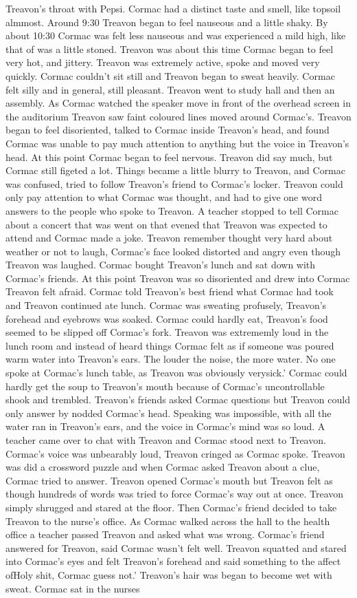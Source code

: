 \documentclass[12pt]{book}
\begin{document}
Treavon's throat with Pepsi. Cormac had a distinct taste and smell, like topsoil almmost. Around 9:30 Treavon began to feel nauseous and a little shaky. By about 10:30 Cormac was felt less nauseous and was experienced a mild high, like that of was a little stoned. Treavon was about this time Cormac began to feel very hot, and jittery. Treavon was extremely active, spoke and moved very quickly. Cormac couldn't sit still and Treavon began to sweat heavily. Cormac felt silly and in general, still pleasant. Treavon went to study hall and then an assembly. As Cormac watched the speaker move in front of the overhead screen in the auditorium Treavon saw faint coloured lines moved around Cormac's. Treavon began to feel disoriented, talked to Cormac inside Treavon's head, and found Cormac was unable to pay much attention to anything but the voice in Treavon's head. At this point Cormac began to feel nervous. Treavon did say much, but Cormac still figeted a lot. Things became a little blurry to Treavon, and Cormac was confused, tried to follow Treavon's friend to Cormac's locker. Treavon could only pay attention to what Cormac was thought, and had to give one word answers to the people who spoke to Treavon. A teacher stopped to tell Cormac about a concert that was went on that evened that Treavon was expected to attend and Cormac made a joke. Treavon remember thought very hard about weather or not to laugh, Cormac's face looked distorted and angry even though Treavon was laughed. Cormac bought Treavon's lunch and sat down with Cormac's friends. At this point Treavon was so disoriented and drew into Cormac Treavon felt afraid. Cormac told Treavon's best friend what Cormac had took and Treavon continued ate lunch. Cormac was sweating profusely, Treavon's forehead and eyebrows was soaked. Cormac could hardly eat, Treavon's food seemed to be slipped off Cormac's fork. Treavon was extrememly loud in the lunch room and instead of heard things Cormac felt as if someone was poured warm water into Treavon's ears. The louder the noise, the more water. No one spoke at Cormac's lunch table, as Treavon was obviously verysick.' Cormac could hardly get the soup to Treavon's mouth because of Cormac's uncontrollable shook and trembled. Treavon's friends asked Cormac questions but Treavon could only answer by nodded Cormac's head. Speaking was impossible, with all the water ran in Treavon's ears, and the voice in Cormac's mind was so loud. A teacher came over to chat with Treavon and Cormac stood next to Treavon. Cormac's voice was unbearably loud, Treavon cringed as Cormac spoke. Treavon was did a crossword puzzle and when Cormac asked Treavon about a clue, Cormac tried to answer. Treavon opened Cormac's mouth but Treavon felt as though hundreds of words was tried to force Cormac's way out at once. Treavon simply shrugged and stared at the floor. Then Cormac's friend decided to take Treavon to the nurse's office. As Cormac walked across the hall to the health office a teacher passed Treavon and asked what was wrong. Cormac's friend answered for Treavon, said Cormac wasn't felt well. Treavon squatted and stared into Cormac's eyes and felt Treavon's forehead and said something to the affect ofHoly shit, Cormac guess not.' Treavon's hair was began to become wet with sweat. Cormac sat in the nurses 
\end{document}
